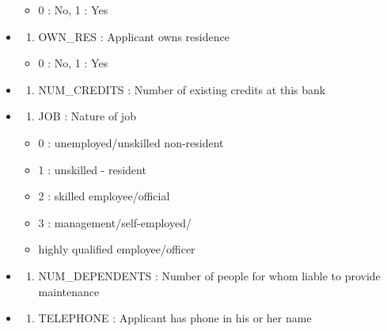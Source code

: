 \documentclass[
]{article}
\providecommand{\tightlist}{%
  \setlength{\itemsep}{0pt}\setlength{\parskip}{0pt}}
\begin{document}
\begin{itemize}
  \begin{itemize}
  \tightlist
  \item
    0 : No, 1 : Yes
  \end{itemize}
\item
  \begin{enumerate}
  \def\labelenumi{\arabic{enumi})}
  \setcounter{enumi}{25}
  \tightlist
  \item
    OWN\_RES : Applicant owns residence
  \end{enumerate}

  \begin{itemize}
  \tightlist
  \item
    0 : No, 1 : Yes
  \end{itemize}
\item
  \begin{enumerate}
  \def\labelenumi{\arabic{enumi})}
  \setcounter{enumi}{26}
  \tightlist
  \item
    NUM\_CREDITS : Number of existing credits at this bank
  \end{enumerate}
\item
  \begin{enumerate}
  \def\labelenumi{\arabic{enumi})}
  \setcounter{enumi}{27}
  \tightlist
  \item
    JOB : Nature of job
  \end{enumerate}

  \begin{itemize}
  \tightlist
  \item
    0 : unemployed/unskilled non-resident
  \item
    1 : unskilled - resident
  \item
    2 : skilled employee/official
  \item
    3 : management/self-employed/
  \item
    highly qualified employee/officer
  \end{itemize}
\item
  \begin{enumerate}
  \def\labelenumi{\arabic{enumi})}
  \setcounter{enumi}{28}
  \tightlist
  \item
    NUM\_DEPENDENTS : Number of people for whom liable to provide
    maintenance
  \end{enumerate}
\item
  \begin{enumerate}
  \def\labelenumi{\arabic{enumi})}
  \setcounter{enumi}{29}
  \tightlist
  \item
    TELEPHONE : Applicant has phone in his or her name
  \end{enumerate}


\end{itemize}
\end{document}
